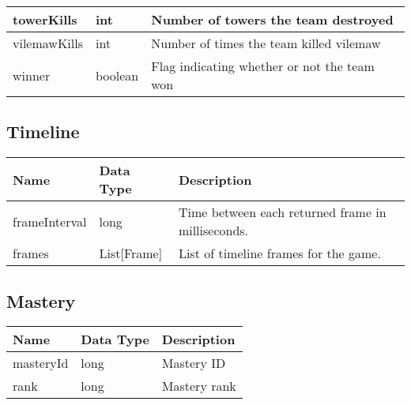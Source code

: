 \begin{table}[!h]
\begin{tabular}{llp{5cm}}
towerKills           & int                      & Number of towers the team destroyed                                                        \\ \hline
vilemawKills         & int                      & Number of times the team killed vilemaw                                                    \\ \hline
winner               & boolean                  & Flag indicating whether or not the team won                                                \\ \hline
\end{tabular}
\end{table}

\FloatBarrier
\subsection{Timeline}
\begin{table}[!h]
\footnotesize
\centering
\begin{tabular}{llp{5cm}}
\textbf{Name} & \textbf{Data Type} & \textbf{Description}                              \\ \hline
frameInterval & long               & Time between each returned frame in milliseconds. \\ \hline
frames        & List{[}Frame{]}    & List of timeline frames for the game.             \\ \hline
\end{tabular}
\end{table}

\FloatBarrier
\subsection{Mastery}
\begin{table}[!h]
\footnotesize
\centering
\begin{tabular}{llp{5cm}}
\textbf{Name} & \textbf{Data Type} & \textbf{Description} \\ \hline
masteryId & long & Mastery ID \\ \hline
rank & long & Mastery rank \\ \hline
\end{tabular}
\end{table}

\FloatBarrier

